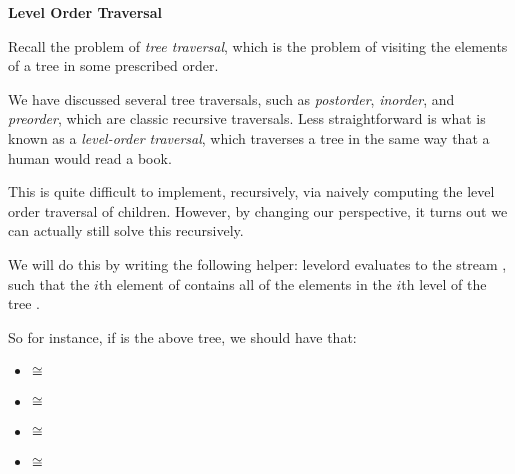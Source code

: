 \documentclass[addpoints,12pt, answers]{exam}
\begin{document}
\begin{questions}
\newpage
{}

\textbf{Level Order Traversal}

Recall the problem of \textit{tree traversal}, which is the problem of visiting
the elements of a tree in some prescribed order.

We have discussed several tree traversals, such as \textit{postorder},
\textit{inorder}, and \textit{preorder}, which are classic recursive traversals.
Less straightforward is what is known as a \textit{level-order traversal}, which
traverses a tree in the same way that a human would read a book.

\begin{center}
\end{center}

This is quite difficult to implement, recursively, via naively computing
the level order traversal of children. However, by changing our perspective,
it turns out we can actually still solve this recursively.

We will do this by writing the following helper:
\spec
  {levelord}
  {}
  {}
  { evaluates to the stream , such that the
  $i$th element of  contains all of the elements in the $i$th
  level of the tree .}

So for instance, if  is the above tree, we should have that:
\begin{itemize}
  \item {} $\cong$ 
  \item {} $\cong$ 
  \item {} $\cong$ 
  \item {} $\cong$ 
\end{itemize}


\end{questions}
\end{document}
